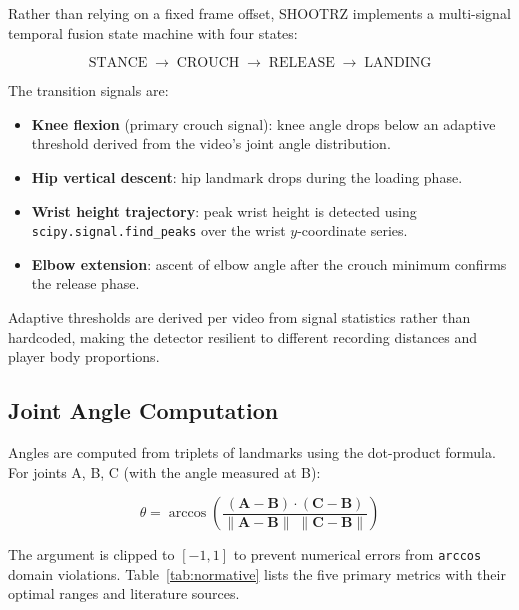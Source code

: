 Rather than relying on a fixed frame offset, SHOOTRZ implements a multi-signal temporal fusion state machine with four states:

\[
  \text{STANCE} \;\rightarrow\; \text{CROUCH} \;\rightarrow\; \text{RELEASE} \;\rightarrow\; \text{LANDING}
\]

The transition signals are:
\begin{itemize}
  \item \textbf{Knee flexion} (primary crouch signal): knee angle drops below an adaptive threshold derived from the video's joint angle distribution.
  \item \textbf{Hip vertical descent}: hip landmark drops during the loading phase.
  \item \textbf{Wrist height trajectory}: peak wrist height is detected using \lstinline|scipy.signal.find_peaks| over the wrist $y$-coordinate series.
  \item \textbf{Elbow extension}: ascent of elbow angle after the crouch minimum confirms the release phase.
\end{itemize}

Adaptive thresholds are derived per video from signal statistics rather than hardcoded, making the detector resilient to different recording distances and player body proportions.

\subsection{Joint Angle Computation}

Angles are computed from triplets of landmarks using the dot-product formula. For joints A, B, C (with the angle measured at B):

\begin{equation}
  \theta = \arccos\!\left(\frac{(\mathbf{A}-\mathbf{B}) \cdot (\mathbf{C}-\mathbf{B})}{\|\mathbf{A}-\mathbf{B}\|\;\|\mathbf{C}-\mathbf{B}\|}\right)
  \label{eq:angle}
\end{equation}

The argument is clipped to $[-1, 1]$ to prevent numerical errors from \lstinline|arccos| domain violations. Table~\ref{tab:normative} lists the five primary metrics with their optimal ranges and literature sources.


